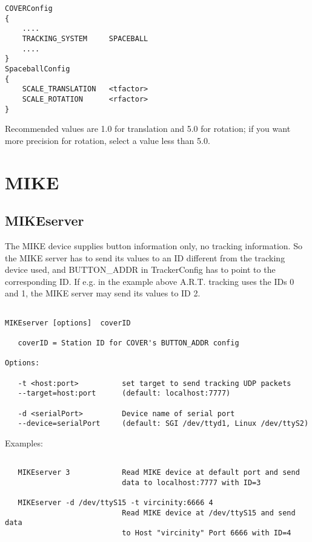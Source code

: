 \small \begin{verbatim}
COVERConfig
{
    ....
    TRACKING_SYSTEM     SPACEBALL
    ....
}
SpaceballConfig
{
    SCALE_TRANSLATION   <tfactor>
    SCALE_ROTATION      <rfactor>
}
\end{verbatim} \normalsize

Recommended values are 1.0 for translation and 5.0 for rotation; if you want more precision for
rotation, select a value less than 5.0.
\clearpage


\section{MIKE}
\subsection{MIKEserver}

The MIKE device supplies button information only, no tracking information. So the MIKE server has to
send its values to an ID different from the tracking device used, and BUTTON\_ADDR in TrackerConfig
has to point to the corresponding ID. If e.g. in the example above A.R.T. tracking uses the IDs 0 and
1, the MIKE server may send its values to ID 2.
 
\begin{samepage}
\small \begin{verbatim}   

MIKEserver [options]  coverID

   coverID = Station ID for COVER's BUTTON_ADDR config

Options:

   -t <host:port>          set target to send tracking UDP packets
   --target=host:port      (default: localhost:7777)

   -d <serialPort>         Device name of serial port
   --device=serialPort     (default: SGI /dev/ttyd1, Linux /dev/ttyS2)
\end{verbatim} \normalsize
\end{samepage}

Examples:
\begin{samepage}
\small \begin{verbatim}   

   MIKEserver 3            Read MIKE device at default port and send
                           data to localhost:7777 with ID=3

   MIKEserver -d /dev/ttyS15 -t vircinity:6666 4
                           Read MIKE device at /dev/ttyS15 and send data
                           to Host "vircinity" Port 6666 with ID=4

\end{verbatim} \normalsize
\end{samepage}
\clearpage

